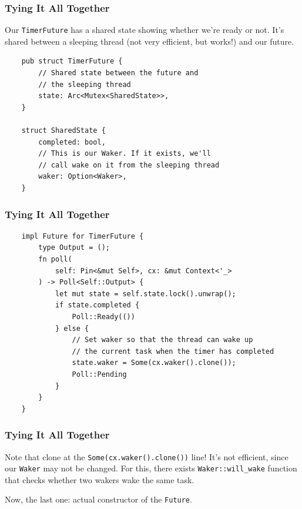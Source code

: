 \documentclass[aspectratio=1610,t]{beamer}
\begin{document}

\begin{frame}[fragile]
\frametitle{Tying It All Together}
Our \texttt{TimerFuture} has a shared state showing whether we're ready or not. It's shared between a sleeping thread (not very efficient, but works!) and our future.

\begin{verbatim}
    pub struct TimerFuture {
        // Shared state between the future and
        // the sleeping thread
        state: Arc<Mutex<SharedState>>,
    }

    struct SharedState {
        completed: bool,
        // This is our Waker. If it exists, we'll
        // call wake on it from the sleeping thread
        waker: Option<Waker>,
    }
\end{verbatim}
\end{frame}


\begin{frame}[fragile]
\frametitle{Tying It All Together}
\begin{verbatim}
    impl Future for TimerFuture {
        type Output = ();
        fn poll(
            self: Pin<&mut Self>, cx: &mut Context<'_>
        ) -> Poll<Self::Output> {
            let mut state = self.state.lock().unwrap();
            if state.completed {
                Poll::Ready(())
            } else {
                // Set waker so that the thread can wake up
                // the current task when the timer has completed
                state.waker = Some(cx.waker().clone());
                Poll::Pending
            }
        }
    }
\end{verbatim}
\end{frame}


\begin{frame}[fragile]
\frametitle{Tying It All Together}
Note that clone at the \texttt{Some(cx.waker().clone())} line! It's not efficient, since our \texttt{Waker} may not be changed. For this, there exists \texttt{Waker::will\_wake} function that checks whether two wakers wake the same task.

Now, the last one: actual constructor of the \texttt{Future}.
\end{frame}
\end{document}
